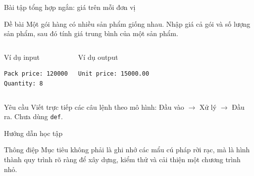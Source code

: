 \documentclass[aspectratio=169,10pt]{beamer}
\begin{document}
\begin{frame}[fragile]{Bài tập tổng hợp ngắn: giá trên mỗi đơn vị}
\small
\begin{block}{Đề bài}
Một gói hàng có nhiều sản phẩm giống nhau. Nhập giá cả gói và số lượng sản phẩm, sau đó tính giá trung bình của một sản phẩm.
\end{block}
\begin{columns}[T,onlytextwidth]
\begin{block}{Ví dụ input}
\begin{lstlisting}[language={}]
Pack price: 120000
Quantity: 8
\end{lstlisting}
\end{block}
\begin{block}{Ví dụ output}
\begin{lstlisting}[language={}]
Unit price: 15000.00
\end{lstlisting}
\end{block}
\end{columns}
\begin{exampleblock}{Yêu cầu}
Viết trực tiếp các câu lệnh theo mô hình: Đầu vào $\rightarrow$ Xử lý $\rightarrow$ Đầu ra. Chưa dùng \texttt{def}.
\end{exampleblock}
\end{frame}

\begin{frame}{Hướng dẫn học tập}
\begin{center}
\end{center}
\begin{alertblock}{Thông điệp}
Mục tiêu không phải là ghi nhớ các mẩu cú pháp rời rạc, mà là hình thành quy trình rõ ràng để xây dựng, kiểm thử và cải thiện một chương trình nhỏ.
\end{alertblock}
\end{frame}
\end{document}
